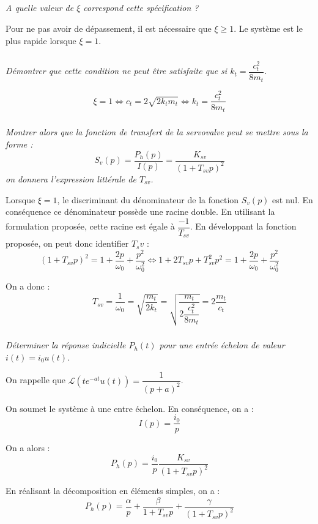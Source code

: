 \begin{multicols}{2}
\subparagraph{}
\textit{A quelle valeur de $\xi$ correspond cette spécification ?}
\ifprof
\begin{corrige}
Pour ne pas avoir de dépassement, il est nécessaire que $\xi \geq 1$. Le
système est le plus rapide lorsque $\xi=1$.
\end{corrige}
\else
\fi

\subparagraph{}
\textit{Démontrer que cette condition ne peut être satisfaite que si $k_t=\dfrac{c_t^2}{8m_t}$.}

\ifprof
$$
\xi = 1 \Leftrightarrow  c_t = 2\sqrt{2k_t m_t} \Leftrightarrow  k_t =
\dfrac{c_t^2}{8 m_t}
$$
\else
\fi

\subparagraph{}
\textit{Montrer alors que la fonction de transfert de la servovalve peut se mettre sous la forme :}
$$
S_v(p)=\dfrac{P_h (p)}{I(p)}=\dfrac{K_{sv}}{\left( 1+T_{sv} p\right)^2 }
$$
\textit{on donnera l'expression littérale de $T_{sv}$.}
\ifprof
\begin{corrige}

Lorsque $\xi=1$, le discriminant du dénominateur de la fonction
$S_v(p)$ est nul. En conséquence ce dénominateur possède une racine double. En
utilisant la formulation proposée, cette racine est égale à
$\dfrac{-1}{T_{sv}}$. En développant la fonction proposée, on peut donc
identifier $T_sv$ :
$$
\left( 1+T_{sv} p\right)^2  = 1+\dfrac{2
p}{\omega_0}+\dfrac{p^2}{\omega_0^2}  \Leftrightarrow 1 + 2 T_{sv} p +T_{sv}^2
p^2 = 1+\dfrac{2
p}{\omega_0}+\dfrac{p^2}{\omega_0^2}   
$$

On a donc : 
$$
T_{sv}=\dfrac{1}{\omega_0} = \sqrt{\dfrac{m_t}{2k_t}} = \sqrt{\dfrac{m_t}{2
\dfrac{c_t^2}{8 m_t}}} = 2\dfrac{m_t}{c_t}
$$
\end{corrige}
\else
\fi


\subparagraph{}
\textit{Déterminer la réponse indicielle $P_h(t)$ pour une entrée échelon de valeur $i(t)=i_0 u(t)$.}

On rappelle que $\mathcal{L}\left(te^{-at}u(t)\right)=\dfrac{1}{\left(p+a\right)^2}$.

\ifprof
\begin{corrige}

On soumet le système à une entre échelon. En conséquence, on a : 
$$
I(p)=\dfrac{i_0}{p}
$$

On a alors :
$$
P_h(p)=\dfrac{i_0}{p}\dfrac{K_{sv}}{\left(1+T_{sv}p\right)^2}
$$

En réalisant la décomposition en éléments simples, on a : 
$$
P_h(p)=\dfrac{\alpha}{p}+\dfrac{\beta}{1+T_{sv}p}+\dfrac{\gamma}{\left(1+T_{sv}
p\right)^2}
$$


\end{corrige}
\end{multicols}
